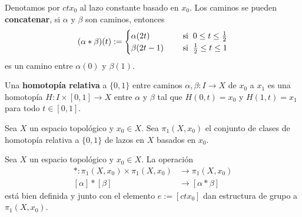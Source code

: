\documentclass{article}
\begin{document}
\vspace{2mm}
\noindent Denotamos por $ctx_{0}$ al lazo constante basado en $x_{0}$. Los caminos se pueden 
\textbf{concatenar}, si $\alpha$ y $\beta$ son caminos, entonces
\begin{equation*}
    (\alpha*\beta)(t):=\begin{cases}
        \alpha(2t) &\quad\text{ si}\hspace{2mm}0\leq t\leq\frac{1}{2} \\
        \beta(2t-1) &\quad\text{ si}\hspace{2mm}\frac{1}{2}\leq t\leq1
    \end{cases}
\end{equation*}
es un camino entre $\alpha(0)$ y $\beta(1)$.

\vspace{2mm}
\begin{dfn}
    Una \textbf{homotopía relativa} a $\{0,1\}$ entre caminos $\alpha,\beta:I\to X$ de $x_{0}$ a 
    $x_{1}$ es una homotopía $H:I\times[0,1]\to X$ entre $\alpha$ y $\beta$ tal que $H(0,t)=x_{0}$ 
    y $H(1,t)=x_{1}$ para todo $t\in[0,1]$.
\end{dfn}

\vspace{2mm}
\begin{dfn}
    Sea $X$ un espacio topológico y $x_{0}\in X$. Sea $\pi_{1}(X,x_{0})$ el conjunto de clases de 
    homotopía relativa a $\{0,1\}$ de lazos en $X$ basados en $x_{0}$.
\end{dfn}

\begin{teo}
    Sea $X$ un espacio topológico y $x_{0}\in X$. La operación
    \begin{align*}
        *:\pi_{1}(X,x_{0})\times\pi_{1}(X,x_{0}) &\to \pi_{1}(X,x_{0}) \\
        [\alpha]*[\beta] &\to [\alpha*\beta]
    \end{align*}
    está bien definida y junto con el elemento $e:=[ctx_{0}]$ dan estructura de grupo a 
    $\pi_{1}(X,x_{0})$.
\end{teo}
\end{document}
